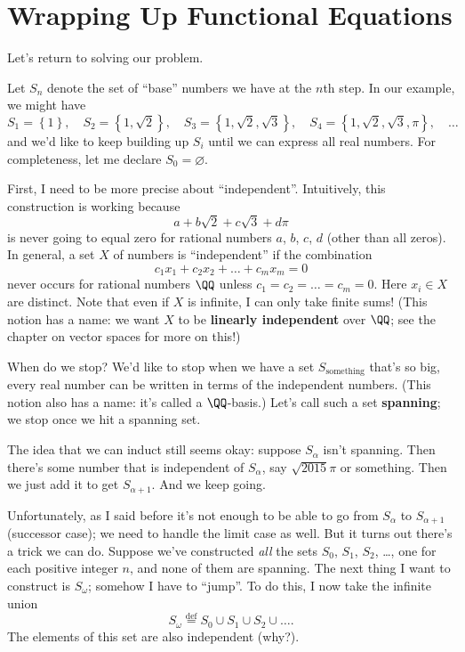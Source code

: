 \section{Wrapping Up Functional Equations}
Let's return to solving our problem.

Let $S_n$ denote the set of ``base'' numbers we have at the $n$th step.
In our example, we might have
\[
	S_1 = \left\{ 1 \right\}, \quad
	S_2 = \left\{ 1, \sqrt 2 \right\}, \quad
	S_3 = \left\{ 1, \sqrt 2, \sqrt 3 \right\}, \quad
	S_4 = \left\{ 1, \sqrt 2, \sqrt 3, \pi \right\}, \quad
	\dots
\]
and we'd like to keep building up $S_i$ until we can express all real numbers.
For completeness, let me declare $S_0 = \varnothing$.

First, I need to be more precise about ``independent''.
Intuitively, this construction is working because
\[ a + b \sqrt 2 + c \sqrt 3 + d \pi \]
is never going to equal zero for rational numbers $a$, $b$, $c$, $d$ (other than all zeros).
In general, a set $X$ of numbers is ``independent'' if the combination
\[ c_1x_1 + c_2x_2 + \dots + c_mx_m = 0 \]
never occurs for rational numbers $\QQ$ unless $c_1 = c_2 = \dots = c_m = 0$.
Here $x_i \in X$ are distinct. Note that even if $X$ is infinite,
I can only take finite sums!
(This notion has a name: we want $X$ to be \textbf{linearly independent} over $\QQ$;
see the chapter on vector spaces for more on this!)

When do we stop?
We'd like to stop when we have a set $S_{\text{something}}$ that's so big,
every real number can be written in terms of the independent numbers.
(This notion also has a name: it's called a $\QQ$-basis.)
Let's call such a set \textbf{spanning};
we stop once we hit a spanning set.

The idea that we can induct still seems okay:
suppose $S_\alpha$ isn't spanning.
Then there's some number that is independent of $S_\alpha$, say $\sqrt{2015}\pi$ or something.
Then we just add it to get $S_{\alpha+1}$.
And we keep going.

Unfortunately, as I said before it's not enough to be able to go from $S_\alpha$ to $S_{\alpha+1}$
(successor case); we need to handle the limit case as well.
But it turns out there's a trick we can do.
Suppose we've constructed \emph{all} the sets $S_0$, $S_1$, $S_2$, \dots, one for each positive integer $n$,
and none of them are spanning.
The next thing I want to construct is $S_\omega$; somehow I have to ``jump''.
To do this, I now take the infinite union
\[ S_\omega \overset{\text{def}}{=} S_0 \cup S_1 \cup S_2 \cup \dots. \]
The elements of this set are also independent (why?).

